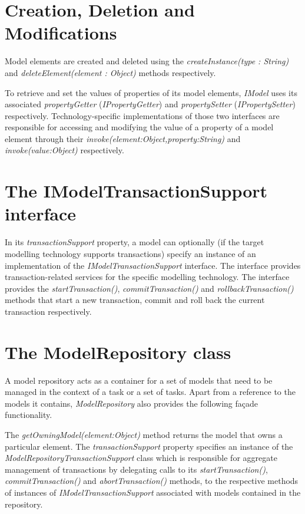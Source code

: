 \section{Creation, Deletion and Modifications}
\label{sec:Design.EMC.CRUD}

Model elements are created and deleted using the \emph{createInstance(type : String)} and \emph{deleteElement(element : Object)} methods respectively.

To retrieve and set the values of properties of its model elements, \emph{IModel} uses its associated \emph{propertyGetter} (\emph{IPropertyGetter}) and \emph{propertySetter} (\emph{IPropertySetter}) respectively. Technology-specific implementations of those two interfaces are responsible for accessing and modifying the value of a property of a model element through their \emph{invoke(element:Object,property:String)} and \emph{invoke(value:Object)} respectively.

\section{The IModelTransactionSupport interface}
\label{sec:EMC.ModelTransactionSupport}
In its \emph{transactionSupport} property, a model can optionally (if the target modelling technology supports transactions) specify an instance of an implementation of the \emph{IModelTransactionSupport} interface. The interface provides transaction-related services for the specific modelling technology. The interface provides the \emph{startTransaction()}, \emph{commitTransaction()} and \emph{rollbackTransaction()} methods that start a new transaction, commit and roll back the current transaction respectively.

\section{The ModelRepository class}

A model repository acts as a container for a set of models that need to be managed in the context of a task or a set of tasks. Apart from a reference to the models it contains, \emph{ModelRepository} also provides the following fa\c{c}ade functionality.

The \emph{getOwningModel(element:Object)} method returns the model that owns a particular element. The \emph{transactionSupport} property specifies an instance of the \emph{ModelRepositoryTransactionSupport} class which is responsible for aggregate management of transactions by delegating calls to its \emph{startTransaction()}, \emph{commitTransaction()} and \emph{abortTransaction()} methods, to the respective methods of instances of \emph{IModelTransactionSupport} associated with models contained in the repository.

